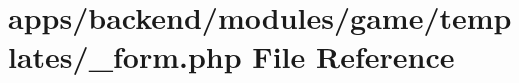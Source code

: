 \hypertarget{backend_2modules_2game_2templates_2__form_8php}{\section{apps/backend/modules/game/templates/\-\_\-form.php File Reference}
\label{backend_2modules_2game_2templates_2__form_8php}
}

